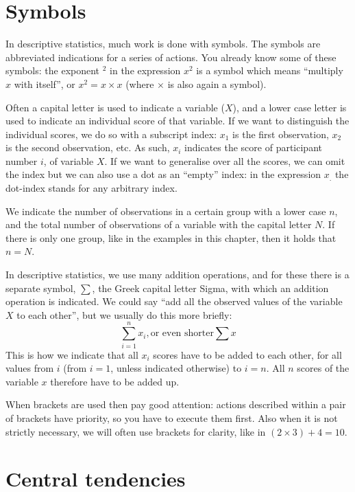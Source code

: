 \documentclass[
]{book}
\begin{document}
\section{Symbols}\label{symbols}

In descriptive statistics, much work is done with symbols. The
symbols are abbreviated indications for a series of actions.
You already know some of these symbols: the exponent \({}^2\) in the expression
\(x^2\) is a symbol which means ``multiply \(x\)
with itself'', or \(x^2 = x \times x\) (where \(\times\) is also again
a symbol).

Often a capital letter is used to indicate a variable (\(X\)),
and a lower case letter is used to indicate an individual score
of that variable. If we want to distinguish the individual
scores, we do so with a subscript index: \(x_1\) is the
first observation, \(x_2\) is the second observation, etc. As such,
\(x_i\) indicates the score of participant number
\(i\), of variable \(X\). If we want to generalise
over all the scores, we can omit the index but
we can also use a dot as an ``empty'' index: in
the expression \(x_.\) the dot-index stands
for any arbitrary index.

We indicate the number of observations in a certain group with a
lower case \(n\), and the total number of observations of a variable
with the capital letter \(N\). If there is only one group, like in
the examples in this chapter, then it holds that \(n=N\).

In descriptive statistics, we use many addition operations, and for these
there is a separate symbol, \(\sum\), the Greek capital letter Sigma,
with which an addition operation is indicated. We could say ``add all the observed
values of the variable \(X\) to each other'', but we usually do this
more briefly:
\[\sum\limits_{i=1}^n x_i, \textrm{or even shorter} \sum x
\]
This is how
we indicate that all \(x_i\) scores have to be added to each other,
for all values from \(i\) (from \(i=1\), unless indicated
otherwise) to \(i=n\). All \(n\) scores of the variable \(x\)
therefore have to be added up.

When brackets are used then pay good attention: actions described
within a pair of brackets have priority, so you have to execute
them first. Also when it is not strictly necessary, we will often use
brackets for clarity, like in \((2\times3)+4=10\).

\section{Central tendencies}\label{central-tendencies}
\end{document}
